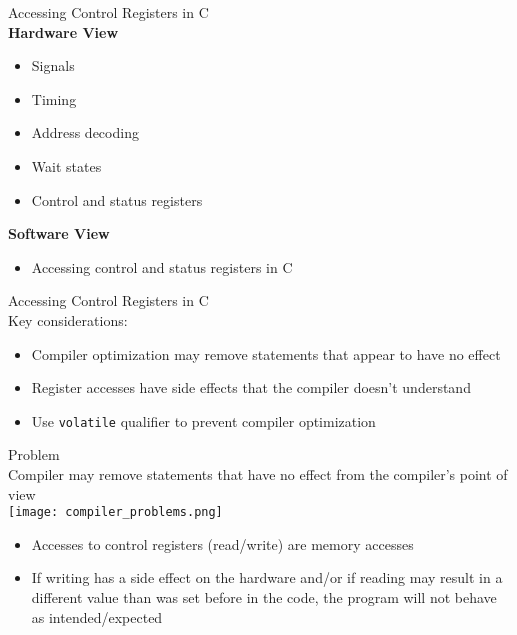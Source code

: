 
\begin{definition}{Accessing Control Registers in C}\\
    \textbf{Hardware View}
    \begin{itemize}
        \item Signals
        \item Timing
        \item Address decoding
        \item Wait states
        \item Control and status registers
    \end{itemize}
    \textbf{Software View}
    \begin{itemize}
        \item Accessing control and status registers in C
    \end{itemize}
\end{definition}

\begin{concept}{Accessing Control Registers in C}\\
Key considerations:
\begin{itemize}
    \item Compiler optimization may remove statements that appear to have no effect
    \item Register accesses have side effects that the compiler doesn't understand
    \item Use \texttt{volatile} qualifier to prevent compiler optimization
\end{itemize}
\end{concept}

\multend

\begin{concept}{Problem}\\
    Compiler may remove statements that have no effect from the compiler's point of view\\
    \texttt{[image: compiler\_problems.png]}
    \begin{itemize}
        \item Accesses to control registers (read/write) are memory accesses
        \item If writing has a side effect on the hardware and/or if reading may result in a different value than was set before in the code,
        the program will not behave as intended/expected
    \end{itemize}
\end{concept}

